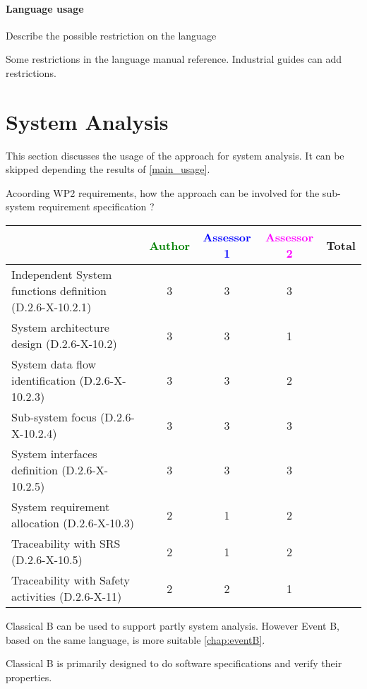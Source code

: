 \paragraph{Language usage} Describe the possible restriction on the language
\begin{author_comment}
Some restrictions in the language manual reference. Industrial guides can add restrictions.
\end{author_comment}

\section{System Analysis}
This section discusses the usage of the approach for system analysis.
It can be skipped depending the results of \ref{main_usage}.

Acoording WP2 requirements, how the approach can be involved for the sub-system requirement specification ?

\begin{tabular}{|l | c | c | c | c|}
\hline
& \textcolor{green}{Author} & \textcolor{blue}{Assessor 1} & \textcolor{magenta}{Assessor 2} & Total \\
\hline
Independent System functions definition (D.2.6-X-10.2.1)  & 3 & 3 & 3 &  \\
\hline 
System architecture design (D.2.6-X-10.2) & 3 & 3 & 1 &  \\
\hline
System data flow identification (D.2.6-X-10.2.3)  & 3 & 3 & 2 &  \\
\hline
Sub-system focus (D.2.6-X-10.2.4)  & 3 & 3 & 3 &  \\
\hline
System interfaces definition (D.2.6-X-10.2.5)  & 3 & 3 & 3 &  \\
\hline
System requirement allocation (D.2.6-X-10.3)  & 2 & 1 & 2 &  \\
\hline
Traceability with SRS (D.2.6-X-10.5)  & 2 & 1 & 2 &  \\
\hline
Traceability with Safety activities (D.2.6-X-11)  & 2 & 2 & 1 &  \\
\hline
\end{tabular}

\begin{author_comment}
Classical B can be used to  support partly  system analysis. However Event B, based on the same language, is more suitable \ref{chap:eventB}.
\end{author_comment}

\begin{assessor2}
Classical B is primarily designed to do software specifications and verify their properties.
\end{assessor2}

